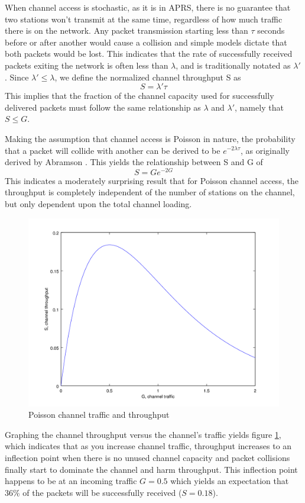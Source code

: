 When channel access is stochastic, as it is in APRS,
there is no guarantee that two stations won't transmit at the same time,
regardless of how much traffic there is on the network.
Any packet transmission starting less than $\tau$ seconds
before or after another would
cause a collision and simple models dictate that both packets would be lost.
This indicates that the rate of successfully received packets exiting the network
is often less than $\lambda$, and is traditionally notated as $\lambda'$. 
Since $\lambda' \leq \lambda$, we define the normalized channel throughput S as
\begin{equation}
	S = \lambda' \tau
\end{equation}
This implies that the fraction of the channel capacity used for successfully
delivered packets must follow the same relationship as $\lambda$ and $\lambda'$,
namely that $S \leq G$.

Making the assumption that channel access is Poisson in nature, 
the probability that a packet will collide with another can be derived to
be  $e^{-2 \lambda \tau}$, as originally derived by Abramson \cite{packetthroughput}.
This yields the relationship between S and G of
\begin{equation}
	S = G e ^ {-2 G}
\end{equation}
This indicates a moderately surprising result that for Poisson channel access,
the throughput is completely independent of the number of stations on the channel,
but only dependent upon the total channel loading.

\begin{figure}
	\centering
	\includegraphics[width=1.0\textwidth]{src/octave/poissonthroughput}
	\caption{Poisson channel traffic and throughput}
	\label{fig:SGpoisson}
\end{figure}
Graphing the channel throughput versus the channel's traffic yields figure 
\ref{fig:SGpoisson}, which indicates that as you increase channel traffic, 
throughput increases to an inflection point when there is no unused channel capacity
and packet collisions finally start to dominate
the channel and harm throughput. This inflection point happens to be at
an incoming traffic $G = 0.5$ which yields an expectation that 36\% of the packets
will be successfully received ($S = 0.18$).

